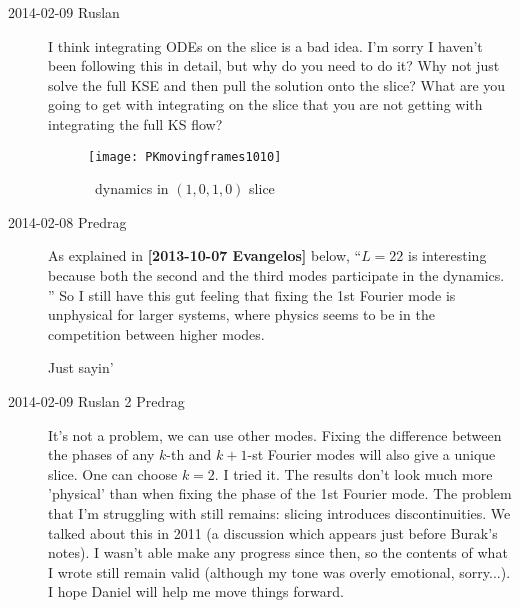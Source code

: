 \begin{description}
\item[2014-02-09 Ruslan] I think integrating ODEs on the slice is a bad idea.
I'm sorry I haven't been following this in detail, but why do you need to do it?
Why not just solve the full KSE and then pull the solution onto the slice?
What are you going to get with integrating on the slice that you
are not getting with integrating the full KS flow?

\begin{figure}%
 \centering
 \texttt{[image: PKmovingframes1010]}

\caption{\twoMode\ dynamics in $(1,0,1,0)$ slice}

\label{fig:PKmovingframes1010}
\end{figure}


\item[2014-02-08 Predrag] As explained in {\bf
[2013-10-07 Evangelos]} below,
``$L=22$ is interesting because both the second
and the third modes participate in the dynamics. '' So
I still have this gut feeling that fixing the 1st Fourier
mode is unphysical for larger systems, where physics seems to be
in the competition between higher modes.

Just sayin'

\item[2014-02-09 Ruslan 2 Predrag] It's not a problem, we can use other modes.
Fixing the difference between the phases of any $k$-th and $k+1$-st Fourier modes will also give a unique slice.
One can choose $k = 2$.  I tried it.  The results don't look much more
'physical' than when fixing the phase of the 1st Fourier mode.  The problem
that I'm struggling with still remains: slicing introduces discontinuities.
We talked about this in 2011 (a discussion which appears just before Burak's notes).
I wasn't able make any progress since then, so the contents of what I wrote still
remain valid (although my tone was overly emotional, sorry...).  I hope Daniel
will help me move things forward.


\end{description}
